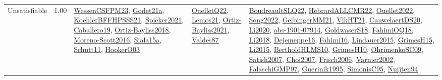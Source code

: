 {\begin{longtable}{p{3cm}r>{\raggedright\arraybackslash}p{6cm}>{\raggedright\arraybackslash}p{6cm}>{\raggedright\arraybackslash}p{8cm}}
\index{Unsatisfiable}\index{Concepts!Unsatisfiable}Unsatisfiable &  1.00 & \hyperref[detail:WessenCSFPM23]{WessenCSFPM23}, \hyperref[detail:Godet21a]{Godet21a}, \hyperref[detail:KoehlerBFFHPSSS21]{KoehlerBFFHPSSS21}, \hyperref[detail:Spieker2021]{Spieker2021}, \hyperref[detail:Caballero19]{Caballero19}, \hyperref[detail:Ortiz-Bayliss2018]{Ortiz-Bayliss2018}, \hyperref[detail:Moreno-Scott2016]{Moreno-Scott2016}, \hyperref[detail:Siala15a]{Siala15a}, \hyperref[detail:Schutt11]{Schutt11}, \hyperref[detail:HookerO03]{HookerO03} & \hyperref[detail:OuelletQ22]{OuelletQ22}, \hyperref[detail:Lemos21]{Lemos21}, \hyperref[detail:Ortiz-Bayliss2021]{Ortiz-Bayliss2021}, \hyperref[detail:Valdes87]{Valdes87} & \hyperref[detail:BoudreaultSLQ22]{BoudreaultSLQ22}, \hyperref[detail:HebrardALLCMR22]{HebrardALLCMR22}, \hyperref[detail:Ouellet2022]{Ouellet2022}, \hyperref[detail:Song2022]{Song2022}, \hyperref[detail:GeibingerMM21]{GeibingerMM21}, \hyperref[detail:VlkHT21]{VlkHT21}, \hyperref[detail:CauwelaertDS20]{CauwelaertDS20}, \hyperref[detail:Li2020]{Li2020}, \hyperref[detail:abs-1901-07914]{abs-1901-07914}, \hyperref[detail:GoldwaserS18]{GoldwaserS18}, \hyperref[detail:FahimiOQ18]{FahimiOQ18}, \hyperref[detail:Li2018]{Li2018}, \hyperref[detail:Dejemeppe16]{Dejemeppe16}, \hyperref[detail:Fahimi16]{Fahimi16}, \hyperref[detail:Lindauer2015]{Lindauer2015}, \hyperref[detail:GrimesH15]{GrimesH15}, \hyperref[detail:Li2015]{Li2015}, \hyperref[detail:BertholdHLMS10]{BertholdHLMS10}, \hyperref[detail:GrimesH10]{GrimesH10}, \hyperref[detail:OhrimenkoSC09]{OhrimenkoSC09}, \hyperref[detail:Satish2007]{Satish2007}, \hyperref[detail:Choi2007]{Choi2007}, \hyperref[detail:Frisch2006]{Frisch2006}, \hyperref[detail:Varnier2002]{Varnier2002}, \hyperref[detail:FalaschiGMP97]{FalaschiGMP97}, \hyperref[detail:Guerinik1995]{Guerinik1995}, \hyperref[detail:SimonisC95]{SimonisC95}, \hyperref[detail:Nuijten94]{Nuijten94}\\

\end{longtable}}
